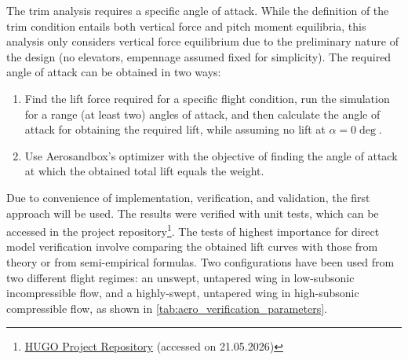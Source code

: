 The trim analysis requires a specific angle of attack. While the definition of the trim condition entails both vertical force and pitch moment equilibria, this analysis only considers vertical force equilibrium due to the preliminary nature of the design (no elevators, empennage assumed fixed for simplicity). The required angle of attack can be obtained in two ways:
\begin{enumerate}
    \item Find the lift force required for a specific flight condition, run the simulation for a range (at least two) angles of attack, and then calculate the angle of attack for obtaining the required lift, while assuming no lift at $\alpha=0\deg$. 
    \item Use Aerosandbox's optimizer with the objective of finding the angle of attack at which the obtained total lift equals the weight.
\end{enumerate}
Due to convenience of implementation, verification, and validation, the first approach will be used. The results were verified with unit tests, which can be accessed in the project repository\footnote{\label{url:github_repo}\href{https://github.com/Teo-Cokonaj/DSE-28}{HUGO Project Repository} (accessed on 21.05.2026)}.
The tests of highest importance for direct model verification involve comparing the obtained lift curves with those from theory or from semi-empirical formulas. Two configurations have been used from two different flight regimes: an unswept, untapered wing in low-subsonic incompressible flow, and a highly-swept, untapered wing in high-subsonic compressible flow, as shown in \autoref{tab:aero_verification_parameters}.


